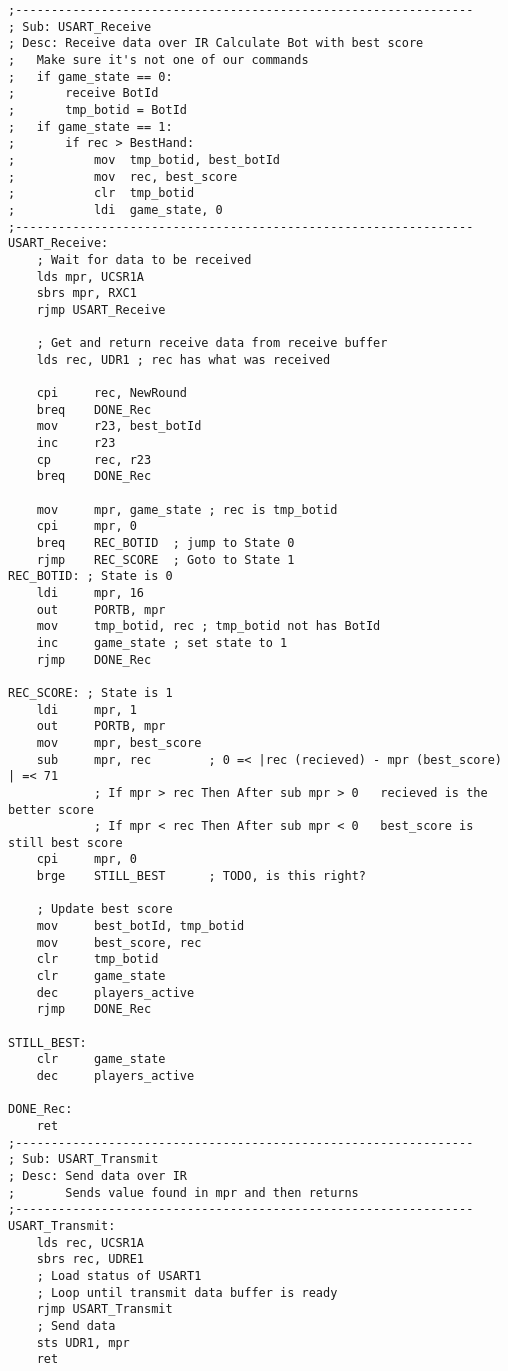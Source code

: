 \documentclass[10pt,letterpaper]{article}
\begin{document}
\begin{verbatim}
;----------------------------------------------------------------
; Sub: USART_Receive
; Desc: Receive data over IR Calculate Bot with best score
;   Make sure it's not one of our commands
;   if game_state == 0:
;       receive BotId
;       tmp_botid = BotId
;   if game_state == 1:
;       if rec > BestHand:
;           mov  tmp_botid, best_botId
;           mov  rec, best_score
;           clr  tmp_botid
;           ldi  game_state, 0
;----------------------------------------------------------------
USART_Receive:
    ; Wait for data to be received
    lds mpr, UCSR1A
    sbrs mpr, RXC1
    rjmp USART_Receive

    ; Get and return receive data from receive buffer
    lds rec, UDR1 ; rec has what was received

    cpi     rec, NewRound
    breq    DONE_Rec
    mov     r23, best_botId
    inc     r23
    cp      rec, r23
    breq    DONE_Rec

    mov     mpr, game_state ; rec is tmp_botid
    cpi     mpr, 0
    breq    REC_BOTID  ; jump to State 0
    rjmp    REC_SCORE  ; Goto to State 1
REC_BOTID: ; State is 0
    ldi     mpr, 16
    out     PORTB, mpr
    mov     tmp_botid, rec ; tmp_botid not has BotId
    inc     game_state ; set state to 1
    rjmp    DONE_Rec

REC_SCORE: ; State is 1
    ldi     mpr, 1
    out     PORTB, mpr
    mov     mpr, best_score
    sub     mpr, rec        ; 0 =< |rec (recieved) - mpr (best_score) | =< 71
            ; If mpr > rec Then After sub mpr > 0   recieved is the better score
            ; If mpr < rec Then After sub mpr < 0   best_score is still best score
    cpi     mpr, 0
    brge    STILL_BEST      ; TODO, is this right?

    ; Update best score
    mov     best_botId, tmp_botid
    mov     best_score, rec
    clr     tmp_botid
    clr     game_state
    dec     players_active
    rjmp    DONE_Rec

STILL_BEST:
    clr     game_state
    dec     players_active

DONE_Rec:
    ret
;----------------------------------------------------------------
; Sub: USART_Transmit
; Desc: Send data over IR
;       Sends value found in mpr and then returns
;----------------------------------------------------------------
USART_Transmit:
    lds rec, UCSR1A
    sbrs rec, UDRE1
    ; Load status of USART1
    ; Loop until transmit data buffer is ready
    rjmp USART_Transmit
    ; Send data
    sts UDR1, mpr
    ret


\end{verbatim}
\end{document}
